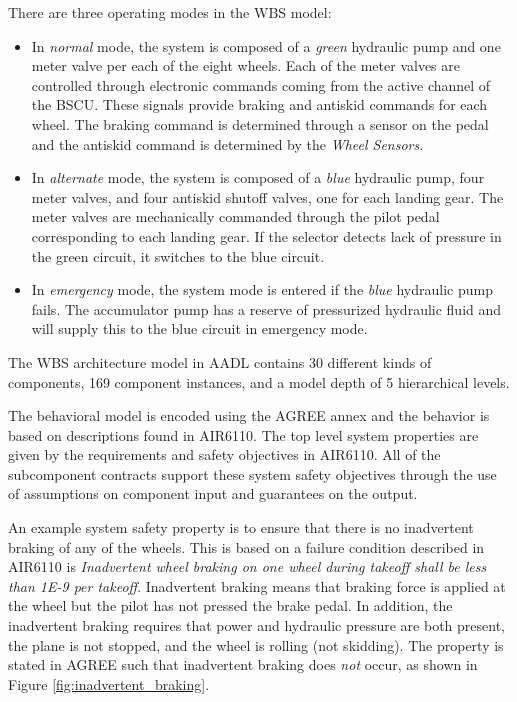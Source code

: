 There are three operating modes in the WBS model:

\begin{itemize}
	\renewcommand{\labelitemi}{\textbullet}
	\item In \textit{normal} mode, the system is composed of a \textit{green} hydraulic pump and one meter valve per each of the eight wheels. Each of the meter valves are controlled through electronic commands coming from the active channel of the BSCU. These signals provide braking and antiskid commands for each wheel. The braking command is determined through a sensor on the pedal and the antiskid command is determined by the \textit{Wheel Sensors}. 
	\item In \textit{alternate} mode, the system is composed of a \textit{blue} hydraulic pump, four meter valves, and four antiskid shutoff valves, one for each landing gear. The meter valves are mechanically commanded through the pilot pedal corresponding to each landing gear. If the selector detects lack of pressure in the green circuit, it switches to the blue circuit. 
	\item In \textit{emergency} mode, the system mode is entered if the \textit{blue} hydraulic pump fails. The accumulator pump has a reserve of pressurized hydraulic fluid and will supply this to the blue circuit in emergency mode. 
\end{itemize}

The WBS architecture model in AADL contains 30 different kinds of components, 169 component instances, and a model depth of 5 hierarchical levels. 

The behavioral model is encoded using the AGREE annex and the behavior is based on descriptions found in AIR6110. The top level system properties are given by the requirements and safety objectives in AIR6110. All of the subcomponent contracts support these system safety objectives through the use of assumptions on component input and guarantees on the output. 

An example system safety property is to ensure that there is no inadvertent braking of any of the wheels. This is based on a failure condition described in AIR6110 is \textit{Inadvertent wheel braking on one wheel during takeoff shall be less than 1E-9 per takeoff}. 
Inadvertent braking means that braking force is applied at the wheel but the pilot has not pressed the brake pedal.  In addition, the inadvertent braking requires that power and hydraulic pressure are both present, the plane is not stopped, and the wheel is rolling (not skidding). The property is stated in AGREE such that inadvertent braking does \textit{not} occur, as shown in Figure \ref{fig:inadvertent_braking}. 

